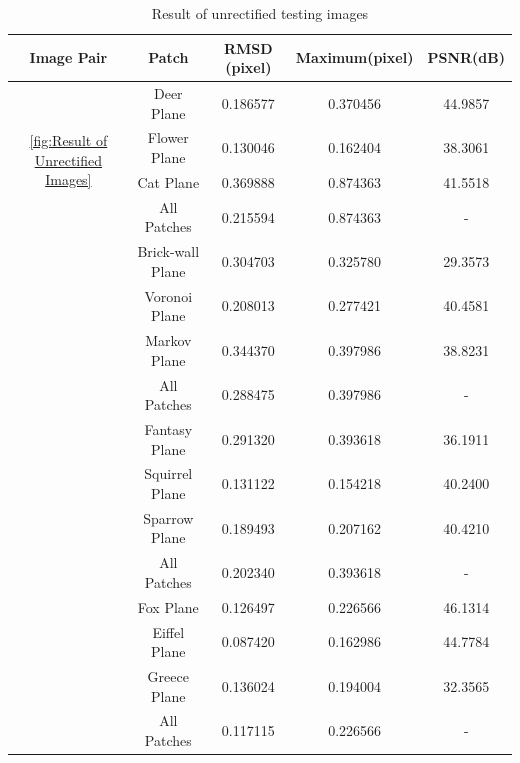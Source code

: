  \begin{table}[htbp]
 	\centering
 	\scriptsize   
 	\begin{tabular}{ccccc}
 		\toprule
 		Image Pair & Patch & {\bfseries RMSD (pixel)} & {\bfseries Maximum(pixel)}&{\bfseries PSNR(dB)}\\ \midrule
 		\multirow{4}{80pt}{\centering \cref{fig:Result of Unrectified Images}}&Deer Plane&  0.186577&0.370456&44.9857 \\
 		\addlinespace[3pt]
 		&Flower Plane  &  0.130046&0.162404&38.3061 \\
 		\addlinespace[3pt]
 		&Cat Plane & 0.369888&0.874363&41.5518 \\ 
 		\addlinespace[3pt]
 		&All Patches & 0.215594&0.874363& - \\ 
 		\addlinespace[6pt]
 		
 		\multirow{4}{80pt}{\centering \cref{fig:Result of Self-built Normal Images(1)}}&Brick-wall Plane&  0.304703&0.325780&29.3573 \\
 		\addlinespace[3pt]
 		&Voronoi Plane  &  0.208013&0.277421&40.4581 \\
 		\addlinespace[3pt]
 		&Markov Plane & 0.344370&0.397986&38.8231 \\ 
 		\addlinespace[3pt]
 		&All Patches & 0.288475&0.397986&- \\
 		\addlinespace[6pt]
 		
 		\multirow{4}{80pt}{\centering \cref{fig:Result of Self-built Normal Images(2)}}&Fantasy Plane&  0.291320&0.393618&36.1911 \\
 		\addlinespace[3pt]
 		&Squirrel Plane  &  0.131122&0.154218&40.2400 \\
 		\addlinespace[3pt]
 		&Sparrow Plane & 0.189493&0.207162&40.4210 \\ 
 		\addlinespace[3pt]
 		&All Patches & 0.202340&0.393618&- \\
 		\addlinespace[6pt]
 		
 		\multirow{4}{80pt}{\centering \cref{fig:Result of Self-built Normal Images(3)}}&Fox Plane&  0.126497&0.226566&46.1314 \\
 		\addlinespace[3pt]
 		&Eiffel Plane  &  0.087420&0.162986&44.7784\\
 		\addlinespace[3pt]
 		&Greece Plane & 0.136024&0.194004&32.3565 \\ 
 		\addlinespace[3pt]
 		&All Patches & 0.117115&0.226566&- \\
 		\bottomrule
 	\end{tabular}
 	\caption{Result of unrectified testing images}  
 	\label{tab:Result of unrectified testing images} 
 \end{table}

